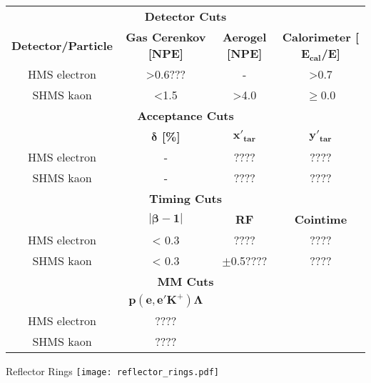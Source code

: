 \begin{table}[ht]
  \centering
  \begin{tabular}{cccc}
    \multicolumn{4}{c}{\large\textbf{Detector Cuts}} \\    
    \textbf{Detector/Particle} & \textbf{Gas Cerenkov [NPE]} & \textbf{Aerogel [NPE]} & \textbf{Calorimeter [$\mathbf{E_{cal}}$/E]} \\
    \hline
    HMS electron & >0.6??? & -    & >0.7     \\
    SHMS kaon    & <1.5    & >4.0 & $\ge$0.0 \\
    \multicolumn{4}{c}{\large\textbf{Acceptance Cuts}} \\
     & \textbf{$\mathbf{\delta}$ [\%]} & \textbf{$\mathbf{x'_{tar}}$} & \textbf{$\mathbf{y'_{tar}}$}  \\
    \hline
    HMS electron & - & ????  & ???? \\
    SHMS kaon    & - & ????  & ???? \\
    \multicolumn{4}{c}{\large\textbf{Timing Cuts}} \\
     & \textbf{$\mathbf{\left|\beta-1\right|}$}  & \textbf{RF} & \textbf{Cointime} \\
    \hline
    HMS electron & < 0.3 & ????          & ???? \\
    SHMS kaon    & < 0.3 &  $\pm$0.5???? & ???? \\
    \multicolumn{4}{c}{\large\textbf{MM Cuts}} \\
     & \textbf{$\mathbf{p(e, e'K^+)\Lambda}$}  &  & \\
    \hline
    HMS electron & ???? & & \\
    SHMS kaon    & ???? & & \\
  \end{tabular}
  \caption{}
  \label{tab:3-3_cuts}
\end{table}

\begin{Mfigure}{Reflector Rings}
  \centering
  \texttt{[image: reflector\_rings.pdf]}
  \caption{Acrylic reflector rings applied to PMT 1 and 2 of the SHMS heavy gas cerenkov.}
  \label{fig:3-3_reflector_rings}
\end{Mfigure}


